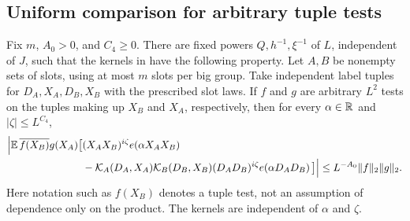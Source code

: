 \subsection{Uniform comparison for arbitrary tuple tests}

\begin{lemma}\label{lem:comparison-kernel}
Fix $m$, $A_0>0$, and $C_4\geq0$.  There are fixed powers
$Q,h^{-1},\xi^{-1}$ of $L$, independent of $J$, such that the
kernels in  have the following property.
Let $A,B$ be nonempty sets of slots, using at most $m$ slots per
big group.  Take independent label tuples for
$D_A,X_A,D_B,X_B$ with the prescribed slot laws.  If $f$ and $g$
are arbitrary $L^2$ tests on the tuples making up $X_B$ and
$X_A$, respectively, then for every $\alpha\in\mathbb R$ and
$|\zeta|\leq L^{C_4}$,
\begin{equation}\label{eq:ideal-comparison}
 \begin{split}
 \Big|\mathbb E\,\overline{f(X_B)}g(X_A)
  \big[&(X_AX_B)^{i\zeta}e\!\left(\alpha X_AX_B\right)\\
      &-\mathcal K_A(D_A,X_A)\mathcal K_B(D_B,X_B)
                (D_AD_B)^{i\zeta}e\!\left(\alpha D_AD_B\right)\big]\Big|
 \leq L^{-A_0}\lVert f\rVert_2\lVert g\rVert_2.
 \end{split}
\end{equation}
Here notation such as $f(X_B)$ denotes a tuple test, not an
assumption of dependence only on the product.  The kernels are
independent of $\alpha$ and $\zeta$.
\end{lemma}

